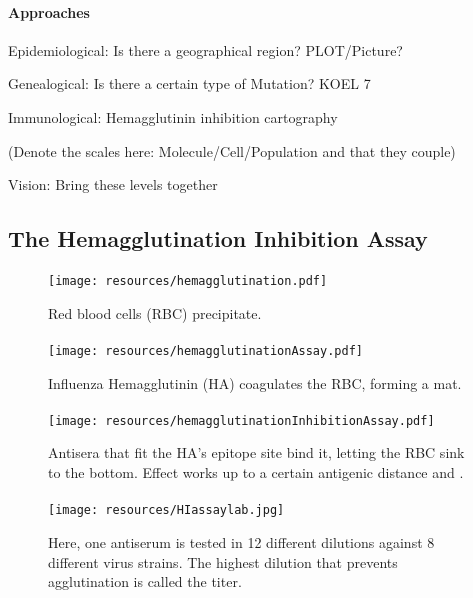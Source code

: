 \documentclass{beamer}
\begin{document}
\begin{darkframes}
    \begin{frame}{\secname}
      \framesubtitle{Approaches}

      Epidemiological: Is there a geographical region? PLOT/Picture?

      Genealogical: Is there a certain type of Mutation? KOEL 7

      Immunological: Hemagglutinin inhibition cartography

      (Denote the scales here: Molecule/Cell/Population and that they couple)

      Vision: Bring these levels together
    \end{frame}




    \subsection{The Hemagglutination Inhibition Assay}

    \begin{frame}{\subsecname}
      \framesubtitle{}
      \begin{figure}
        \texttt{[image: resources/hemagglutination.pdf]}
        \caption{Red blood cells (RBC) precipitate.}
        \label{1}
      \end{figure}
    \end{frame}

    \begin{frame}{\subsecname}
      \framesubtitle{}
      \begin{figure}
        \texttt{[image: resources/hemagglutinationAssay.pdf]}
        \caption{Influenza Hemagglutinin (HA) coagulates the RBC, forming a mat.}
      \end{figure}
    \end{frame}

    \begin{frame}{\subsecname}
      \framesubtitle{}
      \begin{figure}
        \texttt{[image: resources/hemagglutinationInhibitionAssay.pdf]}
        \caption{Antisera that fit the HA's epitope site bind it, letting the RBC sink to the bottom. Effect works up to a certain antigenic distance and .}
      \end{figure}
    \end{frame}

    \begin{frame}{\subsecname}
      \framesubtitle{}
      \begin{figure}
        \texttt{[image: resources/HIassaylab.jpg]}
        \caption{\footnotesize Here, one antiserum is tested in 12 different dilutions against 8 different virus strains. The highest dilution that prevents agglutination is called the titer.}
      \end{figure}
    \end{frame}


\end{darkframes}
\end{document}
